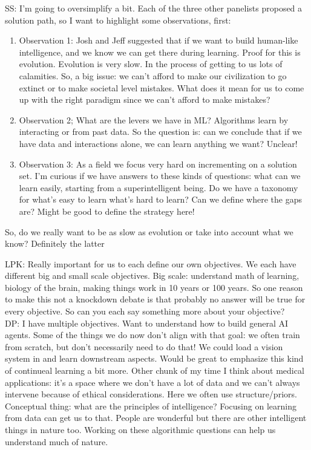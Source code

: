 SS: I'm going to oversimplify a bit. Each of the three other panelists proposed a solution path, so I want to highlight some observations, first:

\begin{enumerate}
    \item Observation 1: Josh and Jeff suggested that if we want to build human-like intelligence, and we know we can get there during learning. Proof for this is evolution. Evolution is very slow. In the process of getting to us lots of calamities. So, a big issue:  we can't afford to make our civilization to go extinct or to make societal level mistakes. What does it mean for us to come up with the right paradigm since we can't afford to make mistakes?
    
    \item Observation 2; What are the levers we have in ML? Algorithms learn by interacting or from past data. So the question is: can we conclude that if we have data and interactions alone, we can learn anything we want? Unclear!
    
    \item Observation 3: As a field we focus very hard on incrementing on a solution set. I'm curious if we have answers to these kinds of questions: what can we learn easily, starting from a superintelligent being. Do we have a taxonomy for what's easy to learn what's hard to learn? Can we define where the gaps are? Might be good to define the strategy here!
\end{enumerate}

So, do we really want to be as slow as evolution or take into account what we know? Definitely the latter \\

\spacerule

LPK: Really important for us to each define our own objectives. We each have different big and small scale objectives. Big scale: understand math of learning, biology of the brain, making things work in 10 years or 100 years. So one reason to make this not a knockdown debate is that probably no answer will be true for every objective. So can you each say something more about your objective? \\

DP: I have multiple objectives. Want to understand how to build general AI agents. Some of the things we do now don't align with that goal: we often train from scratch, but don't necessarily need to do that! We could load a vision system in and learn downstream aspects. Would be great to emphasize this kind of continueal learning a bit more. Other chunk of my time I think about medical applications: it's a space where we don't have a lot of data and we can't always intervene because of ethical considerations. Here we often use structure/priors. Conceptual thing: what are the principles of intelligence? Focusing on learning from data can get us to that. People are wonderful but there are other intelligent things in nature too. Working on these algorithmic questions can help us understand much of nature. \\


